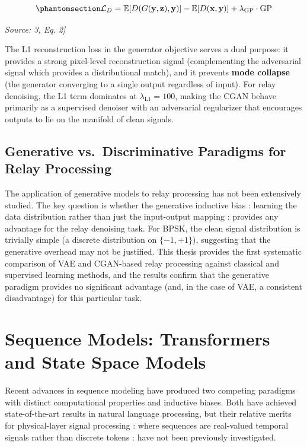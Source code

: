 \begin{equation}\protect\phantomsection\label{eq:wgan-disc-loss}{\mathcal{L}_D = \mathbb{E}[D(G(\mathbf{y}, \mathbf{z}), \mathbf{y})] - \mathbb{E}[D(\mathbf{x}, \mathbf{y})] + \lambda_{\text{GP}} \cdot \text{GP}
}\end{equation} \par{\small\textit{Source: \cite{Laneman2004CooperativeDiversity}3, Eq. 2]}}

The L1 reconstruction loss in the generator objective serves a dual purpose: it provides a strong pixel-level reconstruction signal (complementing the adversarial signal which provides a distributional match), and it prevents \textbf{mode collapse} (the generator converging to a single output regardless of input). For relay denoising, the L1 term dominates at \(\lambda_{\text{L1}} = 100\), making the CGAN behave primarily as a supervised denoiser with an adversarial regularizer that encourages outputs to lie on the manifold of clean signals.

\subsection{Generative vs.~Discriminative Paradigms for Relay Processing}\label{sec:generative-vs.-discriminative-paradigms-for-relay-processing}

The application of generative models to relay processing has not been extensively studied. The key question is whether the generative inductive bias : learning the data distribution rather than just the input-output mapping : provides any advantage for the relay denoising task. For BPSK, the clean signal distribution is trivially simple (a discrete distribution on \(\{-1, +1\}\)), suggesting that the generative overhead may not be justified. This thesis provides the first systematic comparison of VAE and CGAN-based relay processing against classical and supervised learning methods, and the results confirm that the generative paradigm provides no significant advantage (and, in the case of VAE, a consistent disadvantage) for this particular task.

\section{Sequence Models: Transformers and State Space Models}\label{sec:sequence-models-transformers-and-state-space-models}

Recent advances in sequence modeling have produced two competing paradigms with distinct computational properties and inductive biases. Both have achieved state-of-the-art results in natural language processing, but their relative merits for physical-layer signal processing : where sequences are real-valued temporal signals rather than discrete tokens : have not been previously investigated.

